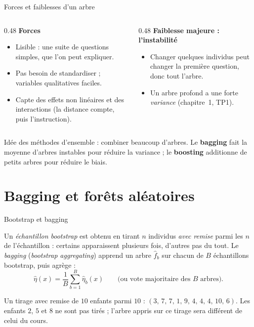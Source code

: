\documentclass[aspectratio=169,11pt]{beamer}
\begin{document}
\begin{frame}{Forces et faiblesses d'un arbre}
  \begin{columns}[T]
    \begin{column}{0.48\textwidth}
      \textbf{Forces}
      \begin{itemize}\small
        \item Lisible : une suite de questions simples, que l'on peut expliquer.
        \item Pas besoin de standardiser ; variables qualitatives faciles.
        \item Capte des effets non linéaires et des interactions (la distance compte, puis l'instruction).
      \end{itemize}
    \end{column}
    \begin{column}{0.48\textwidth}
      \textbf{Faiblesse majeure : l'instabilité}
      \begin{itemize}\small
        \item Changer quelques individus peut changer la première question, donc tout l'arbre.
        \item Un arbre profond a une forte \emph{variance} (chapitre~1, TP1).
      \end{itemize}
    \end{column}
  \end{columns}
  \vskip3mm
  \begin{aretenir}
    Idée des méthodes d'ensemble : combiner beaucoup d'arbres. Le \textbf{bagging} fait la moyenne d'arbres instables pour réduire la variance ; le \textbf{boosting} additionne de petits arbres pour réduire le biais.
  \end{aretenir}
\end{frame}

\section{Bagging et forêts aléatoires}

\begin{frame}{Bootstrap et bagging}
  \begin{definition}
    Un \emph{échantillon bootstrap} est obtenu en tirant $n$ individus \emph{avec remise} parmi les $n$ de l'échantillon : certains apparaissent plusieurs fois, d'autres pas du tout.
    Le \emph{bagging} (\emph{bootstrap aggregating}) apprend un arbre $\hat f_b$ sur chacun de $B$ échantillons bootstrap, puis agrège :
    \[
      \hat\eta(x)=\frac1B\sum_{b=1}^B\hat\eta_b(x)\qquad\text{(ou vote majoritaire des }B\text{ arbres).}
    \]
  \end{definition}
  \begin{exemple}
    Un tirage avec remise de $10$ enfants parmi $10$ : $(3,\,7,\,7,\,1,\,9,\,4,\,4,\,4,\,10,\,6)$. Les enfants $2$, $5$ et $8$ ne sont pas tirés ; l'arbre appris sur ce tirage sera différent de celui du cours.
  \end{exemple}
\end{frame}
\end{document}
